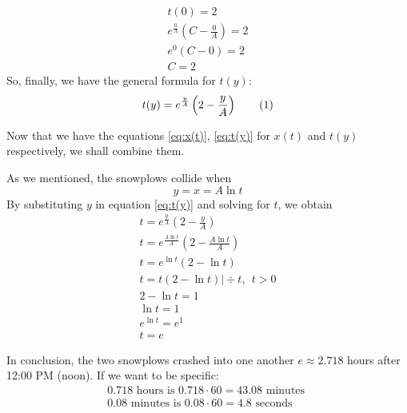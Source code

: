 \documentclass[a4paper,12pt]{article}
\renewcommand*{\textnormal}[1]{\text{ #1 }}
\newcommand\numberthis{\addtocounter{equation}{1}\tag{\theequation}}
\begin{document}
\begin{itemize}
            \begin{gather*}
                t(0) = 2 \\
                e^{\frac{0}{A}}\left(C - \frac{0}{A}\right) = 2 \\
                e^0 \left(C - 0\right) = 2 \\
                C = 2
            \end{gather*}
            So, finally, we have the general formula for \(t(y)\):
            \begin{gather*}
                t(y) = e^\frac{y}{A}\left(2-\frac{y}{A}\right) \numberthis \label{eq:t(y)}
            \end{gather*}
        \end{itemize}

        Now that we have the equations \eqref{eq:x(t)}, \eqref{eq:t(y)} for \(x(t)\) and \(t(y)\) respectively, we shall combine them.

        \hfill \break
        As we mentioned, the snowplows collide when
        \begin{equation*}
            y = x = A \ln t
        \end{equation*}
        By substituting $y$ in equation \eqref{eq:t(y)} and solving for \(t\), we obtain
        \begin{gather*}
            t = e^\frac{y}{A}\left(2-\frac{y}{A}\right) \\
            t = e^\frac{A \ln t}{A}\left(2-\frac{A \ln t}{A}\right) \\
            t = e^{\ln t}\left(2 - \ln t\right) \\
            t = t (2-\ln t) \Bigg | \div t, \ \ t > 0 \\ 
            2-\ln t = 1 \\
            \ln t = 1 \\
            e^{\ln t} = e^1 \\
            \boxed{t = e}
        \end{gather*}

        In conclusion, the two snowplows crashed into one another \(e \approx 2.718\) hours after 12:00 PM (noon). If we want to be specific:
        \begin{gather*}
            0.718 \textnormal{hours is} 0.718 \cdot 60 = 43.08 \textnormal{minutes} \\
            0.08 \textnormal{minutes is} 0.08 \cdot 60 = 4.8 \textnormal{seconds}
        \end{gather*}
\end{document}
